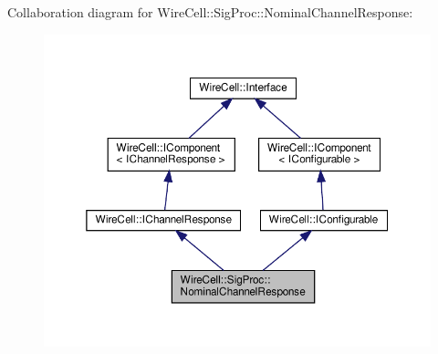 Collaboration diagram for Wire\+Cell\+:\+:Sig\+Proc\+:\+:Nominal\+Channel\+Response\+:
\nopagebreak
\begin{figure}[H]
\begin{center}
\leavevmode
\includegraphics[width=350pt]{class_wire_cell_1_1_sig_proc_1_1_nominal_channel_response__coll__graph}
\end{center}
\end{figure}
